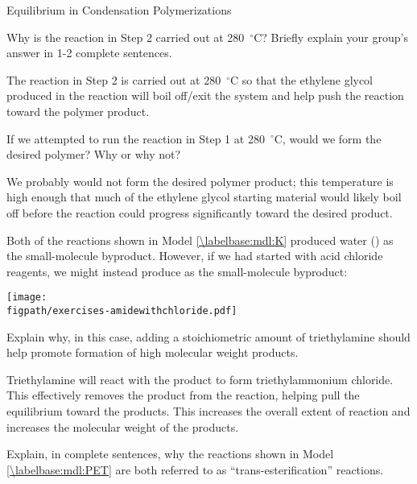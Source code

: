 \begin{activity}{Equilibrium in Condensation Polymerizations}
\begin{ctqs}
	\question Why is the reaction in Step 2 carried out at 280~${}^\circ$C?  Briefly explain your group's answer in 1-2 complete sentences.
	
		\begin{solution}[1.25in]{}
			The reaction in Step 2 is carried out at 280~${}^\circ$C so that the ethylene glycol produced in the reaction will boil off/exit the system and help push the reaction toward the polymer product.
		\end{solution}
	
	\question If we attempted to run the reaction in Step 1 at 280~${}^\circ$C, would we form the desired polymer? Why or why not?
	
		\begin{solution}[1.25in]{}
			We probably would not form the desired polymer product; this temperature is high enough that much of the ethylene glycol starting material would likely boil off before the reaction could progress significantly toward the desired product.
		\end{solution}
		
\end{ctqs}
	


\begin{exercises}

		\exercise Both of the reactions shown in Model \ref{\labelbase:mdl:K} produced water () as the small-molecule byproduct.  However, if we had started with acid chloride reagents, we might instead produce  as the small-molecule byproduct:
		
		\centerline{\texttt{[image: \\figpath/exercises-amidewithchloride.pdf]}}
		
		Explain why, in this case, adding a stoichiometric amount of triethylamine should help promote formation of high molecular weight products.
		
			\begin{solution}{}
					Triethylamine will react with the  product to form triethylammonium chloride.  This effectively removes the  product from the reaction, helping pull the equilibrium toward the products.  This increases the overall extent of reaction and increases the molecular weight of the products.
			\end{solution}
			
		\exercise Explain, in complete sentences, why the reactions shown in Model \ref{\labelbase:mdl:PET} are both referred to as ``trans-esterification'' reactions.
		

\end{exercises}
\end{activity}
